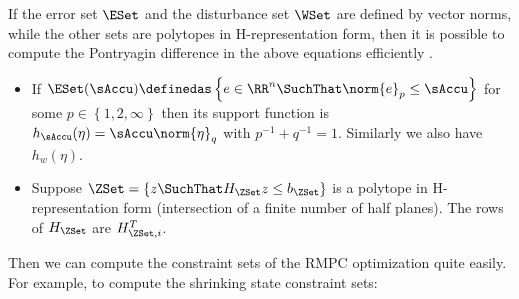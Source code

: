 If the error set $\ESet$ and the disturbance set $\WSet$ are defined
by vector norms, while the other sets are polytopes in H-representation
form, then it is possible to compute the Pontryagin difference in
the above equations efficiently \cite{setcomp}.%
\begin{itemize}
\item If $\ESet(\sAccu)\definedas\left\{ e\in\RR^{n}\SuchThat\norm{e}_{p}\leq\sAccu\right\} $
for some $p\in\left\{ 1,2,\infty\right\} $ then its support function
is $h_{\sAccu}(\eta)=\sAccu\norm{\eta}_{q}$ with $p^{-1}+q^{-1}=1$.
Similarly we also have $h_{w}(\eta)$.
\item Suppose $\ZSet=\left\{ z\SuchThat H_{\ZSet}z\leq b_{\ZSet}\right\} $
is a polytope in H-representation form (intersection of a finite number
of half planes). The rows of $H_{\ZSet}$ are $H_{\ZSet,i}^{T}$.
\end{itemize}
Then we can compute the constraint sets of the RMPC optimization quite
easily. For example, to compute the shrinking state constraint sets:


